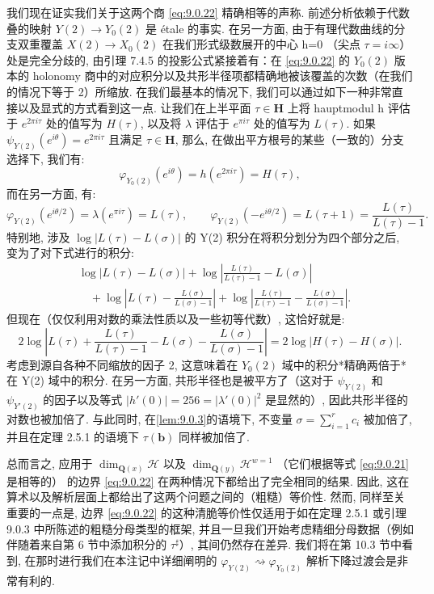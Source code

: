 \begin{remark}
我们现在证实我们关于这两个商 \eqref{eq:9.0.22} 精确相等的声称. 
前述分析依赖于代数叠的映射 \(Y(2) \to Y_0(2)\) 是 {\'e}tale 的事实. 
在另一方面, 由于有理代数曲线的分支双重覆盖 \(X(2) \to X_0(2)\) 
在我们形式级数展开的中心 h=0 （尖点 \(\tau=i\infty\)）处是完全分歧的, 
由引理 7.4.5 的投影公式紧接着有：在 \eqref{eq:9.0.22} 的 \(Y_0(2)\) 版本的 holonomy 商中的对应积分以及共形半径项都精确地被该覆盖的次数（在我们的情况下等于 2）所缩放. 
在我们最基本的情况下, 我们可以通过如下一种非常直接以及显式的方式看到这一点. 
让我们在上半平面 \(\tau \in \mathbf{H}\) 上将 hauptmodul h 评估于 \(e^{2\pi i\tau}\) 处的值写为 \(H(\tau)\), 
以及将 \(\lambda\) 评估于 \(e^{\pi i\tau}\) 处的值写为 \(L(\tau)\). 
如果 \(\psi_{Y(2)}(e^{i\theta}) = e^{2\pi i\tau}\) 且满足 \(\tau \in \mathbf{H}\), 
那么, 在做出平方根号的某些（一致的）分支选择下, 我们有:
\[ \varphi_{Y_0(2)}(e^{i\theta}) = h(e^{2\pi i \tau}) = H(\tau), \]
而在另一方面, 有:
\[ \varphi_{Y(2)}(e^{i\theta/2}) = \lambda(e^{\pi i \tau}) = L(\tau), \qquad \varphi_{Y(2)}(-e^{i\theta/2}) = L(\tau+1) = \frac{L(\tau)}{L(\tau)-1}. \]
特别地, 涉及 \(\log |L(\tau) - L(\sigma)|\) 的 Y(2) 积分在将积分划分为四个部分之后, 
变为了对下式进行的积分:
\[
\begin{aligned}
&\log |L(\tau) - L(\sigma)| + \log \left| \frac{L(\tau)}{L(\tau) - 1} - L(\sigma) \right| \\
&\quad + \log \left| L(\tau) - \frac{L(\sigma)}{L(\sigma) - 1} \right| + \log \left| \frac{L(\tau)}{L(\tau) - 1} - \frac{L(\sigma)}{L(\sigma) - 1} \right|.
\end{aligned}
\]
但现在（仅仅利用对数的乘法性质以及一些初等代数）, 这恰好就是:
\[ 2\log\left|L(\tau) + \frac{L(\tau)}{L(\tau) - 1} - L(\sigma) - \frac{L(\sigma)}{L(\sigma) - 1}\right| = 2\log|H(\tau) - H(\sigma)|. \]
考虑到源自各种不同缩放的因子 2, 这意味着在 \(Y_0(2)\) 域中的积分*精确两倍于*在 Y(2) 域中的积分. 
在另一方面, 共形半径也是被平方了（这对于 \(\psi_{Y(2)}\) 和 \(\psi_{Y'(2)}\) 的因子以及等式 \(|h'(0)| = 256 = |\lambda'(0)|^2\) 是显然的）, 
因此共形半径的对数也被加倍了. 
与此同时, 在\autoref{lem:9.0.3}的语境下, 不变量 \(\sigma = \sum_{i=1}^{r} c_i\) 被加倍了, 
并且在定理 2.5.1 的语境下 \(\tau(\mathbf{b})\) 同样被加倍了.

总而言之, 应用于 \(\dim_{\mathbf{Q}(x)} \mathcal{H}\) 以及 \(\dim_{\mathbf{Q}(y)} \mathcal{H}^{w=1}\) （它们根据等式 \eqref{eq:9.0.21} 是相等的） 
的边界 \eqref{eq:9.0.22} 在两种情况下都给出了完全相同的结果. 
因此, 这在算术以及解析层面上都给出了这两个问题之间的（粗糙）等价性. 
然而, 同样至关重要的一点是, 边界 \eqref{eq:9.0.22} 的这种清脆等价性仅适用于如在定理 2.5.1 或引理 9.0.3 中所陈述的粗糙分母类型的框架, 
并且一旦我们开始考虑精细分母数据（例如伴随着来自第 6 节中添加积分的 \(\tau^{\sharp}\)）, 
其间仍然存在差异. 
我们将在第 10.3 节中看到, 在那时进行我们在本注记中详细阐明的 \(\varphi_{Y(2)} \rightsquigarrow \varphi_{Y_0(2)}\) 解析下降过渡会是非常有利的. \end{remark}